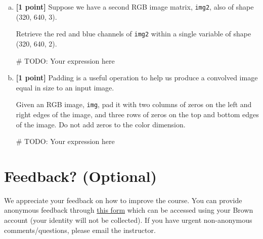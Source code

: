 \documentclass[11pt]{article}
\begin{document}
\begin{enumerate}[(a)]
    \pagebreak
    \item \textbf{[1 point]} Suppose we have a second RGB image matrix, \texttt{img2}, also of shape (320, 640, 3).
    
    \begin{tcolorbox}[colback=orange!5!white,colframe=orange!75!black]
    Retrieve the red and blue channels of \texttt{img2} within a single variable of shape (320, 640, 2).
    \end{tcolorbox}
    
    \begin{tcolorbox}[colback=white!5!white,colframe=green!75!black,height=2cm]
    \begin{python}
    # TODO: Your expression here
    \end{python}
    \end{tcolorbox}
    
    \item \textbf{[1 point]} Padding is a useful operation to help us produce a convolved image equal in size to an input image. 
    
    \begin{tcolorbox}[colback=orange!5!white,colframe=orange!75!black]
    Given an RGB image, \texttt{img}, pad it with two columns of zeros on the left and right edges of the image, and three rows of zeros on the top and bottom edges of the image. Do not add zeros to the color dimension.
    \end{tcolorbox}
    
    \begin{tcolorbox}[colback=white!5!white,colframe=green!75!black,height=2cm]
    \begin{python}
    # TODO: Your expression here
    \end{python}
    \end{tcolorbox}
    
\end{enumerate}


\pagebreak
\section*{Feedback? (Optional)}
We appreciate your feedback on how to improve the course. You can provide anonymous feedback through \href{https://forms.gle/uwBwicWfkYH9v6BU6}{this form} which can be accessed using your Brown account (your identity will not be collected). If you have urgent non-anonymous comments/questions, please email the instructor. 
\end{document}
